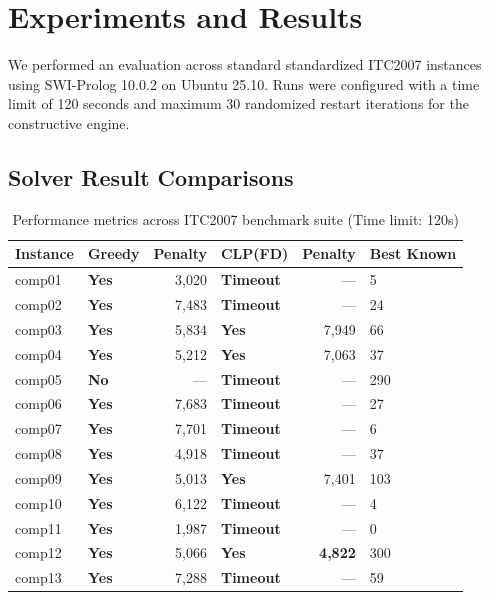 \documentclass[11pt,letterpaper]{article}
\begin{document}
\clearpage

\section{Experiments and Results}
We performed an evaluation across standard standardized ITC2007 instances using SWI-Prolog 10.0.2 on Ubuntu 25.10. Runs were configured with a time limit of 120 seconds and maximum 30 randomized restart iterations for the constructive engine.

\subsection{Solver Result Comparisons}

\begin{table}[H]
\centering
\caption{Performance metrics across ITC2007 benchmark suite (Time limit: 120s)}
\begin{tabular}{@{}llrlrl@{}}
\toprule
\textbf{Instance} & \textbf{Greedy} & \textbf{Penalty} & \textbf{CLP(FD)} & \textbf{Penalty} & \textbf{Best Known} \\ \midrule
comp01 & \textbf{Yes} & 3,020   & \textbf{Timeout}  & ---     & 5     \\
comp02 & \textbf{Yes} & 7,483   & \textbf{Timeout}  & ---     & 24    \\
comp03 & \textbf{Yes} & 5,834   & \textbf{Yes}  & 7,949   & 66    \\
comp04 & \textbf{Yes} & 5,212   & \textbf{Yes}  & 7,063   & 37    \\
comp05 & \textbf{No } & ---     & \textbf{Timeout}  & ---     & 290   \\
comp06 & \textbf{Yes} & 7,683   & \textbf{Timeout}  & ---     & 27    \\
comp07 & \textbf{Yes} & 7,701   & \textbf{Timeout}  & ---     & 6     \\
comp08 & \textbf{Yes} & 4,918   & \textbf{Timeout}  & ---     & 37    \\
comp09 & \textbf{Yes} & 5,013   & \textbf{Yes}  & 7,401   & 103   \\
comp10 & \textbf{Yes} & 6,122   & \textbf{Timeout}  & ---     & 4     \\
comp11 & \textbf{Yes} & 1,987   & \textbf{Timeout}  & ---     & 0     \\
comp12 & \textbf{Yes} & 5,066   & \textbf{Yes}  & \textbf{4,822} & 300   \\
comp13 & \textbf{Yes} & 7,288   & \textbf{Timeout}  & ---     & 59    \\

\end{tabular}
\end{table}
\end{document}
